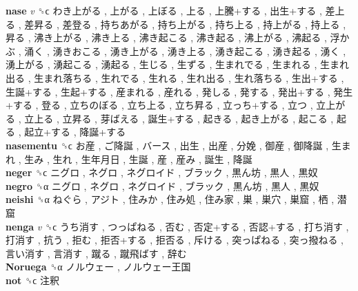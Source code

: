 \textbf{nase} \emph{v}  ␝ϲ   わき上がる ,  上がる ,  上ぼる ,  上る ,  上騰+する ,  出生+する ,  差上る ,  差昇る ,  差登る ,  持ちあがる ,  持ち上がる ,  持ち上る ,  持上がる ,  持上る ,  昇る ,  沸き上がる ,  沸き上る ,  沸き起こる ,  沸き起る ,  沸上がる ,  沸起る ,  浮かぶ ,  涌く ,  湧きおこる ,  湧き上がる ,  湧き上る ,  湧き起こる ,  湧き起る ,  湧く ,  湧上がる ,  湧起こる ,  湧起る ,  生じる ,  生ずる ,  生まれでる ,  生まれる ,  生まれ出る ,  生まれ落ちる ,  生れでる ,  生れる ,  生れ出る ,  生れ落ちる ,  生出+する ,  生誕+する ,  生起+する ,  産まれる ,  産れる ,  発しる ,  発する ,  発出+する ,  発生+する ,  登る ,  立ちのぼる ,  立ち上る ,  立ち昇る ,  立っち+する ,  立つ ,  立上がる ,  立上る ,  立昇る ,  芽ばえる ,  誕生+する ,  起きる ,  起き上がる ,  起こる ,  起る ,  起立+する ,  降誕+する   \\
\textbf{nasementu} ␝ϲ   お産 ,  ご降誕 ,  バース ,  出生 ,  出産 ,  分娩 ,  御産 ,  御降誕 ,  生まれ ,  生み ,  生れ ,  生年月日 ,  生誕 ,  産 ,  産み ,  誕生 ,  降誕   \\
\textbf{neger} ␝ϲ   ニグロ ,  ネグロ ,  ネグロイド ,  ブラック ,  黒ん坊 ,  黒人 ,  黒奴   \\
\textbf{negro} ␝α   ニグロ ,  ネグロ ,  ネグロイド ,  ブラック ,  黒ん坊 ,  黒人 ,  黒奴   \\
\textbf{neishi} ␝α   ねぐら ,  アジト ,  住みか ,  住み処 ,  住み家 ,  巣 ,  巣穴 ,  巣窟 ,  栖 ,  潜窟   \\
\textbf{nenga} \emph{v}  ␝ϲ   うち消す ,  つっぱねる ,  否む ,  否定+する ,  否認+する ,  打ち消す ,  打消す ,  抗う ,  拒む ,  拒否+する ,  拒否る ,  斥ける ,  突っぱねる ,  突っ撥ねる ,  言い消す ,  言消す ,  蹴る ,  蹴飛ばす ,  辞む   \\
\textbf{Noruega} ␝α   ノルウェー ,  ノルウェー王国   \\
\textbf{not} ␝ϲ   注釈   \\
